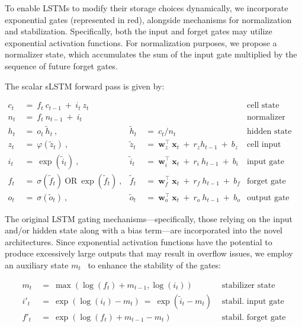 To enable LSTMs to modify their storage choices dynamically, we incorporate exponential gates (represented in red), alongside mechanisms for normalization and stabilization. Specifically, both the input and forget gates may utilize exponential activation functions. For normalization purposes, we propose a normalizer state, which accumulates the sum of the input gate multiplied by the sequence of future forget gates.

The scalar sLSTM forward pass is given by:

\begin{align}
\label{eq:slstmforward}
c_t \ &= \  f_t \ c_{t-1} \ + \ i_t \ z_t & & 
 &\text{cell state} \\
n_t \ &= \  f_t \ n_{t-1} \ + \ i_t  & & 
 &\text{normalizer state} \\
h_t \ &= \ o_t \ \tilde{h}_t \ ,
  &\tilde{h}_t \ &= \ c_t / n_t
&\text{hidden state} \\
z_t \ &= \ \varphi \left( \tilde{z}_t \right) \ , 
  &\tilde{z}_t \ &=  \ \mathbf{w}^\top_{z} \ \mathbf{x}_t \ + \
  r_{z}  h_{t-1} \ + \  b_{z}
  &\text{cell input} \\
i_t \ &= \ \!\exp \left( \tilde{i}_t  \right) \ , 
  &\tilde{i}_t \ &= \ \mathbf{w}^\top_{i} \ \mathbf{x}_t \ + \
  r_{i}  \ h_{t-1} \ + \  b_{i}
  &\text{input gate} \\
f_t \ &= \ \sigma \left(  \tilde{f}_t \right) \ \text{OR} \
\!\exp \left(  \tilde{f}_t \right) \ ,
  &\tilde{f}_t \ &= \ \mathbf{w}^\top_{f} \ \mathbf{x}_t  \ + \
  r_{f}  \ h_{t-1} \ + \  b_{f}
  &\text{forget gate} \\
o_t \ &= \ \sigma \left( \tilde{o}_t \right) \ , 
  &\tilde{o}_t  \ &= \ \mathbf{w}^\top_{o} \ \mathbf{x}_t \ + \
  r_{o}  \ h_{t-1} \ + \  b_{o}
  &\text{output gate} 
\end{align}

The original LSTM gating mechanisms—specifically, those relying on the input and/or hidden state along with a bias term—are incorporated into the novel architectures. Since exponential activation functions have the potential to produce excessively large outputs that may result in overflow issues, we employ an auxiliary state \mbox{$m_t$~\citep{Milakov:18arxiv}} to enhance the stability of the gates:

\begin{align}
\label{eq:slstmstabil}
m_t \ &= \ \max \left( \log ( f_t ) + m_{t-1} , \log ( i_t ) \right) &\text{stabilizer state} \\
i'_t \ &= \ \!\exp \left( \log \left ( i_t \right) - m_t \right) \ = \ \!\exp \left( \tilde{i}_t - m_t \right) \ \, 
  &\text{stabil. input gate} \\
f'_t \ &= \ \!\exp \left( \log \left( f_t \right) + m_{t-1} - m_t \right) \ \, 
  &\text{stabil. forget gate}
\end{align}

